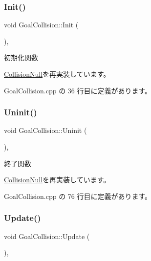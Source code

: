 \subsubsection{\texorpdfstring{Init()}{Init()}}
{\footnotesize\ttfamily void Goal\+Collision\+::\+Init (\begin{DoxyParamCaption}{ }\end{DoxyParamCaption})\hspace{0.3cm}{\ttfamily [override]}, {\ttfamily [virtual]}}



初期化関数 



\mbox{\hyperlink{class_collision_null_af5db1d080c1c0c5a1199062850d8a2ff}{Collision\+Null}}を再実装しています。



 Goal\+Collision.\+cpp の 36 行目に定義があります。

\mbox{\label{class_goal_collision_ab818bad44ffcd595f1c495e659c0b348}} 
\subsubsection{\texorpdfstring{Uninit()}{Uninit()}}
{\footnotesize\ttfamily void Goal\+Collision\+::\+Uninit (\begin{DoxyParamCaption}{ }\end{DoxyParamCaption})\hspace{0.3cm}{\ttfamily [override]}, {\ttfamily [virtual]}}



終了関数 



\mbox{\hyperlink{class_collision_null_a7c6d0ec502efc55e2f406415451152f5}{Collision\+Null}}を再実装しています。



 Goal\+Collision.\+cpp の 76 行目に定義があります。

\mbox{\label{class_goal_collision_a1e3995dc2f5ba2678580d06699ca6936}} 
\subsubsection{\texorpdfstring{Update()}{Update()}}
{\footnotesize\ttfamily void Goal\+Collision\+::\+Update (\begin{DoxyParamCaption}{ }\end{DoxyParamCaption})\hspace{0.3cm}{\ttfamily [override]}, {\ttfamily [virtual]}}



